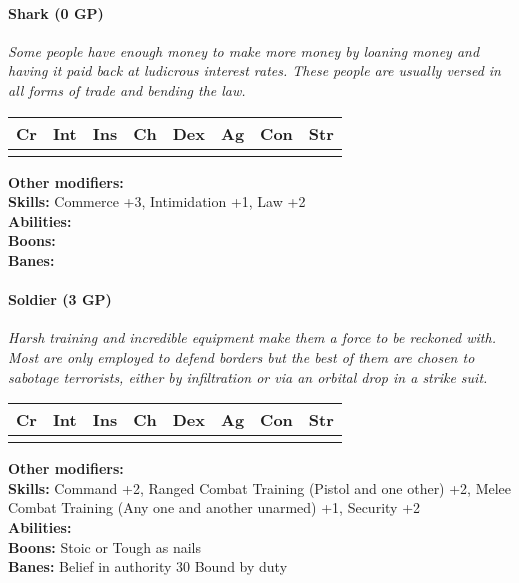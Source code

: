 \paragraph*{Shark (0 GP)}
\textit{Some people have enough money to make more money by loaning money and having it paid back at ludicrous interest rates. These people are usually versed in all forms of trade and bending the law.}\par
\begin{tabular}{|l|l|l|l|l|l|l|l|}
	\hline
	Cr & Int & Ins & Ch & Dex & Ag & Con & Str \\ \hline
	&  &  &  &  &  &  &  \\ \hline
\end{tabular}\par
\noindent\textbf{Other modifiers:} \\
\textbf{Skills:} Commerce +3,
Intimidation +1,
Law +2\\
\textbf{Abilities:} \\
\textbf{Boons:} \\
\textbf{Banes:} \\

\hrulefill
\paragraph*{Soldier (3 GP)}
\textit{Harsh training and incredible equipment make them a force to be reckoned with. Most are only employed to defend borders but the best of them are chosen to sabotage terrorists, either by infiltration or via an orbital drop in a strike suit.}\par
\begin{tabular}{|l|l|l|l|l|l|l|l|}
	\hline
	Cr & Int & Ins & Ch & Dex & Ag & Con & Str \\ \hline
	&  &  &  &  &  &  &  \\ \hline
\end{tabular}\par
\noindent\textbf{Other modifiers:} \\
\textbf{Skills:} Command +2,
Ranged Combat Training (Pistol and one other) +2,
Melee Combat Training (Any one and another unarmed) +1,
Security +2\\
\textbf{Abilities:} \\
\textbf{Boons:} Stoic or Tough as nails\\
\textbf{Banes:} Belief in authority 30
Bound by duty\\

\hrulefill
